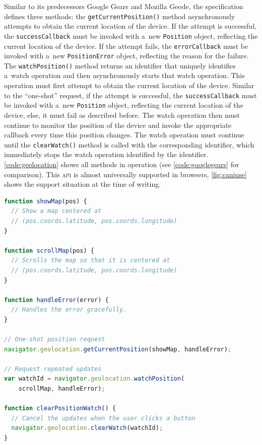 \documentclass[sigconf,hyphens]{acmart}
\begin{document}
Similar to its predecessors Google Gears and Mozilla Geode,
the specification defines three methods:
the \texttt{getCurrentPosition()} method asynchronously attempts
to obtain the current location of the device.
If the attempt is successful, the \texttt{successCallback} must be invoked
with a~new \texttt{Position} object, reflecting the current location of the device.
If the attempt fails, the \texttt{errorCallback} must be invoked
with a~new \texttt{PositionError} object,
reflecting the reason for the failure.
The \texttt{watchPosition()} method returns an identifier that uniquely
identifies a~watch operation and then asynchronously starts that watch operation.
This operation must first attempt to obtain the current location of the device.
Similar to the ``one-shot'' request,
if the attempt is successful, the \texttt{successCallback} must be invoked
with a~new \texttt{Position} object, reflecting the current location of the device,
else, it must fail as described before.
The watch operation then must continue to monitor the position of the device
and invoke the appropriate callback every time this position changes.
The watch operation must continue until the \texttt{clearWatch()} method
is called with the corresponding identifier,
which immediately stops the watch operation identified by the identifier.
\autoref{code:geolocation} shows all methods in operation
(see \autoref{code:googlegears} for comparison). 
This \textsc{api} is almost universally supported in browsers,
\autoref{fig:caniuse} shows the support situation at the time of writing.

\begin{lstlisting}[caption={Geolocation \textsc{api}},
  label=code:geolocation, language=JavaScript, float=h] 
function showMap(pos) {
  // Show a map centered at
  // (pos.coords.latitude, pos.coords.longitude)
}

function scrollMap(pos) {
  // Scrolls the map so that it is centered at
  // (pos.coords.latitude, pos.coords.longitude)
}

function handleError(error) {
  // Handles the error gracefully.
}

// One-shot position request
navigator.geolocation.getCurrentPosition(showMap, handleError);

// Request repeated updates
var watchId = navigator.geolocation.watchPosition(
    scrollMap, handleError);

function clearPositionWatch() {
  // Cancel the updates when the user clicks a button
  navigator.geolocation.clearWatch(watchId);
}	
\end{lstlisting}
\end{document}
